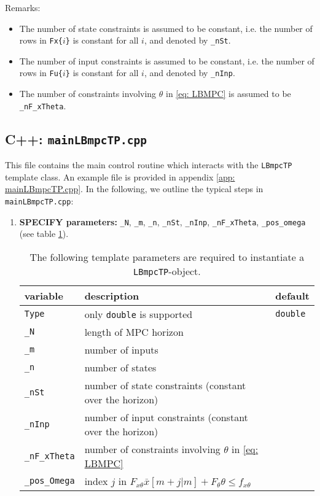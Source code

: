 \documentclass[letter]{article}
\begin{document}
\begin{sffamily}
\noindent
Remarks:
\begin{itemize}
	\item The number of state constraints is assumed to be constant, i.e. the number of rows in \texttt{Fx\{$i$\}} is constant for all $i$, and  denoted by \texttt{\_nSt}.
	\item The number of input constraints is assumed to be constant, i.e. the number of rows in \texttt{Fu\{$i$\}} is constant for all $i$, and denoted by \texttt{\_nInp}.
	\item The number of constraints involving $\theta$ in \eqref{eq: LBMPC} is assumed to be \texttt{\_nF\_xTheta}.
\end{itemize}


\subsection{C++: \texttt{mainLBmpcTP.cpp}}
This file contains the main control routine which interacts with the \texttt{LBmpcTP} template class. An example file is provided in appendix \ref{app: mainLBmpcTP.cpp}. In the following, we outline the typical steps in \texttt{mainLBmpcTP.cpp}:

\begin{enumerate}
	\item \textbf{SPECIFY parameters:} \texttt{\_N}, \texttt{\_m}, \texttt{\_n}, \texttt{\_nSt}, \texttt{\_nInp}, \texttt{\_nF\_xTheta}, \texttt{\_pos\_omega} (see table \ref{tab: instantiateLBpmcTP}).
	
		\begin{table}[!htdp]
		\caption{The following template parameters are required to instantiate a \texttt{LBmpcTP}-object.}
		\begin{center}
		\begin{tabular}{|l|l|l|}\hline
		{
 			\bf variable} & description & default \\ \hline\hline
 
			\texttt{Type} & only \texttt{double} is supported & \texttt{double} \\ \hline
 			\texttt{\_N} & length of MPC horizon & \\ \hline
 			\texttt{\_m} & number of inputs & \\ \hline
 			\texttt{\_n} & number of states & \\ \hline 
 			\texttt{\_nSt} & number of state constraints (constant over the horizon) & \\ \hline
 			\texttt{\_nInp} & number of input constraints (constant over the horizon) & \\ \hline
	 		\texttt{\_nF\_xTheta} & number of constraints involving $\theta$ in \eqref{eq: LBMPC} & \\ \hline
 			\texttt{\_pos\_Omega} & index $j$ in $F_{x\theta}\bar{x}[m+j|m] + F_\theta \theta \leq f_{x\theta}$ & \\ \hline 
		\end{tabular}
		\end{center}
		\label{tab: instantiateLBpmcTP}
		\end{table}	
	

\end{enumerate}
\end{sffamily}
\end{document}
